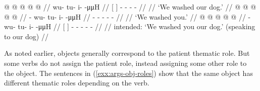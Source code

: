 \pex\label{exx:args-obj-notboth}%
\a\label{ex:args-obj-notboth-phrase}%
%
\begingl
	\gla	{}   @ {} {}  @ {} @ {} @ {} @ {} //
	\glb	{}    {} wu- tu- i-  -μμH //
	\glc	{}[    {}]
			- - -  - //
	\gld	{}   {} {}  {} {} {} {} //
	\glft	‘We washed our dog.’
		//
\endgl
\a\label{ex:args-obj-notboth-pron}%
%
\begingl
	\gla	{} @ {} @ {} @ {} @ {} @ {} //
	\glb	{}- wu- tu- i-  -μμH //
	\glc	{}- - - -  - //
	\gld	{} {} {} {} {} {} //
	\glft	‘We washed you.’
		//
\endgl
\a\label{ex:args-obj-notboth-both}%
\ljudge{*}%
%
\begingl
	\gla	{}   @ {} {}  @ {} @ {} @ {} @ {} //
	\glb	{}    {} - wu- tu- i-  -μμH //
	\glc	{}[    {}]
			- - - -  - //
	\gld	{}   {} {}  {} {} {} {} //
	\glft	intended: ‘We washed you our dog.’ (speaking to our dog)
		//
\endgl
\xe


As noted earlier, objects generally correspond to the patient thematic role. But some verbs do not assign the patient role, instead assigning some other role to the object. The sentences in (\ref{exx:args-obj-roles}) show that the same object has different thematic roles depending on the verb.

